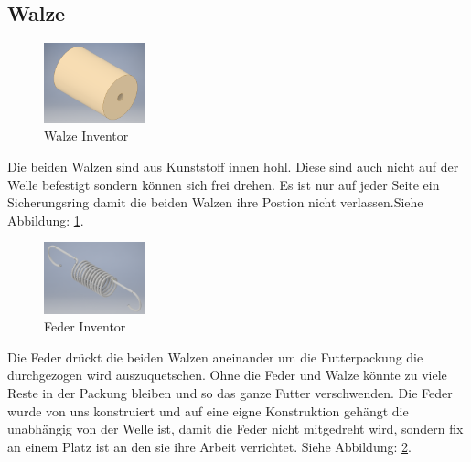 \newpage
\subsection{Walze}

\begin{figure}
\vspace{-20pt}
  \begin{center}
    \includegraphics[width=0.26\textwidth]{Bilder/Inventor/Rolle}
  \end{center}
  \caption{Walze Inventor}
  \label{Walze_Inventor}
  \vspace{-20pt}
\end{figure}

Die beiden Walzen sind aus Kunststoff innen hohl. Diese sind auch nicht auf der Welle befestigt sondern können sich frei drehen. Es ist nur auf jeder Seite ein Sicherungsring damit die beiden Walzen ihre Postion nicht verlassen.Siehe Abbildung: \ref{Walze_Inventor}. \\

\vspace{60pt}

\begin{figure}
\vspace{-20pt}
  \begin{center}
    \includegraphics[width=0.26\textwidth]{Bilder/Inventor/Feder}
  \end{center}
  \caption{Feder Inventor}
  \label{Feder_Inventor}
\end{figure}

Die Feder drückt die beiden Walzen aneinander um die Futterpackung die durchgezogen wird auszuquetschen. Ohne die Feder und Walze könnte zu viele Reste in der Packung bleiben und so das ganze Futter verschwenden. Die Feder wurde von uns konstruiert und auf eine eigne Konstruktion gehängt die unabhängig von der Welle ist, damit die Feder nicht mitgedreht wird, sondern fix an einem Platz ist an den sie ihre Arbeit verrichtet. Siehe Abbildung: \ref{Feder_Inventor}.
